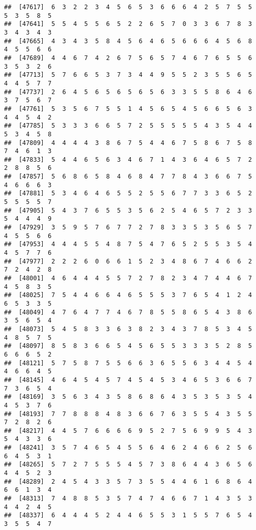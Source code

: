 \documentclass[
]{book}
\begin{document}
\begin{verbatim}
##  [47617]  6  3  2  2  3  4  5  6  5  3  6  6  6  4  2  5  7  5  5  5  3  5  8  5
##  [47641]  5  5  4  5  5  6  5  2  2  6  5  7  0  3  3  6  7  8  3  3  4  3  4  3
##  [47665]  4  3  4  3  5  8  4  5  6  4  6  5  6  6  6  4  5  6  8  4  5  5  6  6
##  [47689]  4  4  6  7  4  2  6  7  5  6  5  7  4  6  7  6  5  5  6  3  5  3  2  6
##  [47713]  5  7  6  6  5  3  7  3  4  4  9  5  5  2  3  5  5  6  5  4  4  5  7  7
##  [47737]  2  6  4  5  6  5  6  5  6  5  6  3  3  5  5  8  6  4  6  3  7  5  6  7
##  [47761]  5  3  5  6  7  5  5  1  4  5  6  5  4  5  6  6  5  6  3  4  4  5  4  2
##  [47785]  5  3  3  3  6  6  5  7  2  5  5  5  5  5  4  3  5  4  4  5  3  4  5  8
##  [47809]  4  4  4  4  3  8  6  7  5  4  4  6  7  5  8  6  7  5  8  7  4  6  1  3
##  [47833]  5  4  4  6  5  6  3  4  6  7  1  4  3  6  4  6  5  7  2  2  8  8  5  6
##  [47857]  5  6  8  6  5  8  4  6  8  4  7  7  8  4  3  6  6  7  5  4  6  6  6  3
##  [47881]  5  3  4  6  4  6  5  5  2  5  5  6  7  7  3  3  6  5  2  5  5  5  5  7
##  [47905]  5  4  3  7  6  5  5  3  5  6  2  5  4  6  5  7  2  3  3  5  4  4  4  9
##  [47929]  3  5  9  5  7  6  7  7  2  7  8  3  3  5  3  5  6  5  7  4  5  5  6  6
##  [47953]  4  4  4  5  5  4  8  7  5  4  7  6  5  2  5  5  3  5  4  4  5  7  7  6
##  [47977]  2  2  2  6  0  6  6  1  5  2  3  4  8  6  7  4  6  6  2  7  2  4  2  8
##  [48001]  4  6  4  4  4  5  5  7  2  7  8  2  3  4  7  4  4  6  7  4  5  8  3  5
##  [48025]  7  5  4  4  6  6  4  6  5  5  5  3  7  6  5  4  1  2  4  6  5  3  3  5
##  [48049]  4  7  6  4  7  7  4  6  7  8  5  5  8  6  5  4  3  8  6  3  5  6  5  4
##  [48073]  5  4  5  8  3  3  6  3  8  2  3  4  3  7  8  5  3  4  5  4  8  5  7  5
##  [48097]  8  5  8  3  6  6  5  4  5  6  5  5  3  3  3  5  2  8  5  6  6  6  5  2
##  [48121]  5  7  5  8  7  5  5  6  6  3  6  5  5  6  3  4  4  5  4  4  6  6  4  5
##  [48145]  4  6  4  5  4  5  7  4  5  4  5  3  4  6  5  3  6  6  7  7  3  6  5  4
##  [48169]  3  5  6  3  4  3  5  8  6  8  6  4  3  5  3  5  3  5  4  4  5  3  7  6
##  [48193]  7  7  8  8  8  4  8  3  6  6  7  6  3  5  5  4  3  5  5  7  2  8  2  6
##  [48217]  4  4  5  7  6  6  6  6  9  5  2  7  5  6  9  9  5  4  3  5  4  3  3  6
##  [48241]  3  5  7  4  6  5  4  5  5  6  4  6  2  4  6  6  2  5  6  6  4  5  3  1
##  [48265]  5  7  2  7  5  5  5  4  5  7  3  8  6  4  4  3  6  5  6  4  4  5  2  3
##  [48289]  2  4  5  4  3  3  5  7  3  5  5  4  4  6  1  6  8  6  4  6  6  1  3  4
##  [48313]  7  4  8  8  5  3  5  7  4  7  4  6  6  7  1  4  3  5  3  4  4  2  4  5
##  [48337]  6  4  4  4  5  2  4  4  6  5  5  3  1  5  5  7  6  5  4  3  5  5  4  7

\end{verbatim}
\end{document}
